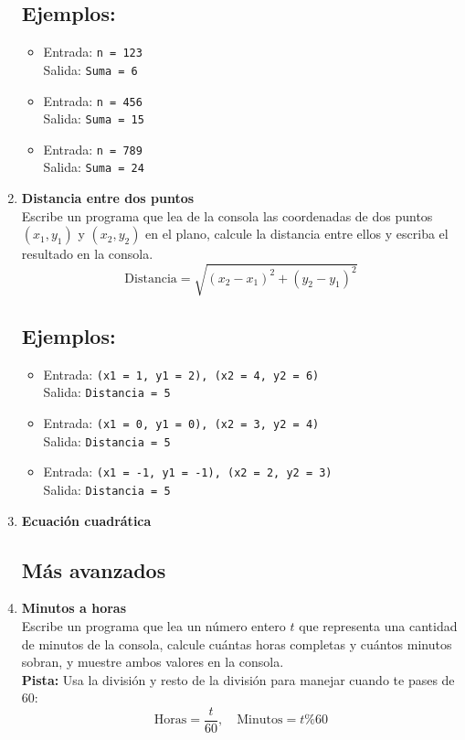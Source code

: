 \begin{enumerate}
    \subsection*{Ejemplos:}
    \begin{itemize}
        \item Entrada: \texttt{n = 123}\\
              Salida: \texttt{Suma = 6}
        \item Entrada: \texttt{n = 456}\\
              Salida: \texttt{Suma = 15}
        \item Entrada: \texttt{n = 789}\\
              Salida: \texttt{Suma = 24}
    \end{itemize}
    
    \item \textbf{Distancia entre dos puntos}\\
    Escribe un programa que lea de la consola las coordenadas de dos puntos \( (x_1, y_1) \) y \( (x_2, y_2) \) en el plano, calcule la distancia entre ellos y escriba el resultado en la consola.\\
    \[
    \text{Distancia} = \sqrt{(x_2 - x_1)^2 + (y_2 - y_1)^2}
    \]
    \subsection*{Ejemplos:}
    \begin{itemize}
        \item Entrada: \texttt{(x1 = 1, y1 = 2), (x2 = 4, y2 = 6)}\\
              Salida: \texttt{Distancia = 5}
        \item Entrada: \texttt{(x1 = 0, y1 = 0), (x2 = 3, y2 = 4)}\\
              Salida: \texttt{Distancia = 5}
        \item Entrada: \texttt{(x1 = -1, y1 = -1), (x2 = 2, y2 = 3)}\\
              Salida: \texttt{Distancia = 5}
    \end{itemize}

    \item \textbf{Ecuación cuadrática}\\
    

\subsection*{Más avanzados}
    \item \textbf{Minutos a horas}\\
    Escribe un programa que lea un número entero \(t\) que representa una cantidad de minutos de la consola, calcule cuántas horas completas y cuántos minutos sobran, y muestre ambos valores en la consola.\\
    \textbf{Pista:} Usa la división y resto de la división para manejar cuando te pases de 60:
    \[
    \text{Horas} = \frac{t}{60}, \quad \text{Minutos} = t \% 60
    \]

\end{enumerate}
